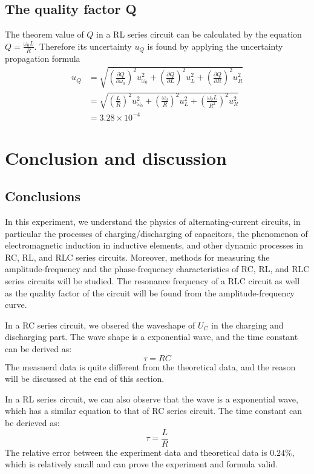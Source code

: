 \documentclass[12pt, a4paper]{article}
\begin{document}
\subsection{The quality factor Q}
The theorem value of $Q$ in a RL series circuit can be calculated by the equation $Q=\frac{\omega_0 L}{R}$. Therefore its uncertainty $u_Q$ is found by applying the uncertainty propagation formula
\begin{align*}
	u_{Q}&=\sqrt{\left(\frac{\partial Q}{\partial \omega_0}\right)^2u_{\omega_0}^2+\left(\frac{\partial Q}{\partial L}\right)^2u_L^2+\left(\frac{\partial Q}{\partial R}\right)^2u_R^2}\\
	&=\sqrt{\left(\frac{L}{R}\right)^2u_{\omega_0}^2+\left(\frac{\omega_0}{R}\right)^2u_L^2+\left(\frac{\omega_0L}{R^2}\right)^2u_R^2}\\
	&=3.28\times10^{-4}
\end{align*}

\section{Conclusion and discussion}
\subsection{Conclusions}
In this experiment, we understand the physics of alternating-current circuits, 
in particular the processes of charging/discharging of capacitors, the phenomenon 
of electromagnetic induction in inductive elements, and other dynamic processes in RC, 
RL, and RLC series circuits. Moreover, methods for measuring the amplitude-frequency and 
the phase-frequency characteristics of RC, RL, and RLC series circuits will be studied. 
The resonance frequency of a RLC circuit as well as the quality factor of the circuit will
 be found from the amplitude-frequency curve.

In a RC series circuit, we obsered the waveshape of $U_C$ in the charging and discharging part. 
The wave shape is a exponential wave, and the time constant can be derived as: 
$$\tau=RC$$
The measuerd data is quite different from the theoretical data, and the reason will be discussed at 
the end of this section.

In a RL series circuit, we can also observe that the wave is a exponential wave, which has a 
similar equation to that of RC series circuit. The time constant can be derieved as:
$$\tau=\frac{L}{R}$$
The relative error between the experiment data and theoretical data is $0.24\%$, which is relatively 
small and can prove the experiment and formula valid.
\end{document}
